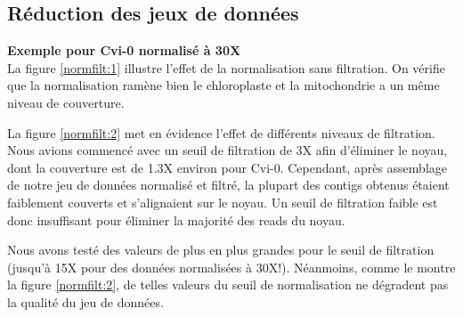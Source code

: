 \documentclass[a4paper]{article}
\begin{document}
\subsection{Réduction des jeux de données}
\hspace{1cm}\textbf{Exemple pour Cvi-0 normalisé à 30X}\\

La figure \ref{normfilt:1} illustre l'effet de la normalisation sans filtration. On vérifie que la normalisation ramène bien le chloroplaste et la mitochondrie a un même niveau de couverture. 

La figure \ref{normfilt:2} met en évidence l'effet de différents niveaux de filtration. Nous avions commencé avec un seuil de filtration de 3X afin d'éliminer le noyau, dont la couverture est de 1.3X environ pour Cvi-0. Cependant, après assemblage de notre jeu de données normalisé et filtré, la plupart des contigs obtenus étaient faiblement couverts et s'alignaient sur le noyau. Un seuil de filtration faible est donc insuffisant pour éliminer la majorité des reads du noyau. 

Nous avons testé des valeurs de plus en plus grandes pour le seuil de filtration (jusqu'à 15X pour des données normalisées à 30X!). Néanmoins, comme le montre la figure \ref{normfilt:2}, de telles valeurs du seuil de normalisation ne dégradent pas la qualité du jeu de données. 
\end{document}
